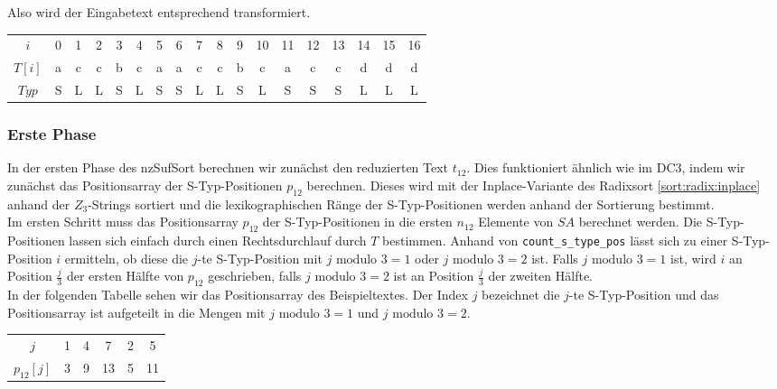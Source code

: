 Also wird der Eingabetext entsprechend transformiert.

\begin{table}[H]
	\footnotesize
	\centering
	\begin{tabular}{c| c c c c c c c c c c c c c c c c c}
		$i$ & 0 & 1 & 2 & 3 & 4 & 5 & 6 & 7 & 8 & 9 & 10 & 11 & 12 & 13 & 14 & 15 & 16 \\
		$T[i]$ & a & c & c & b & c & a & a & c & c & b & c & a & c & c & d & d & d \\
		$Typ$ & S & L & L & S & L & S & S & L & L & S & L & S & S & S & L & L & L
	\end{tabular}
\end{table}

\subsubsection{Erste Phase}

In der ersten Phase des nzSufSort berechnen wir zunächst den reduzierten Text $t_{12}$. Dies funktioniert ähnlich wie im DC3, indem wir zunächst das Positionsarray der S-Typ-Positionen $p_{12}$ berechnen. Dieses wird mit der Inplace-Variante des Radixsort \cref{sort:radix:inplace} anhand der $Z_3$-Strings sortiert und die lexikographischen Ränge der S-Typ-Positionen werden anhand der Sortierung bestimmt. \\

Im ersten Schritt muss das Positionsarray $p_{12}$ der S-Typ-Positionen in die ersten $n_{12}$ Elemente von $SA$ berechnet werden. Die S-Typ-Positionen lassen sich einfach durch einen Rechtsdurchlauf durch $T$ bestimmen. Anhand von  \texttt{count\_s\_type\_pos} lässt sich zu einer S-Typ-Position $i$ ermitteln, ob diese die $j$-te S-Typ-Position mit $j \text{ modulo } 3 = 1$ oder $j \text{ modulo } 3 = 2$ ist. Falls $j \text{ modulo } 3 = 1$ ist, wird $i$ an Position $\frac{j}{3}$ der ersten Hälfte von $p_{12}$ geschrieben, falls $j \text{ modulo } 3 = 2$ ist an Position $\frac{j}{3}$ der zweiten Hälfte. \\
In der folgenden Tabelle sehen wir das Positionsarray des Beispieltextes. Der Index $j$ bezeichnet die $j$-te S-Typ-Position und das Positionsarray ist aufgeteilt in die Mengen mit $j \text{ modulo } 3 = 1$ und $j \text{ modulo } 3 = 2$.

\begin{table}[H]
	\footnotesize
	\centering
	\begin{tabular}{c| c c c || c c }
		$j$ & 1 & 4 & 7 & 2 & 5 \\
		$p_{12}[j]$ & 3 & 9 & 13 & 5 & 11 
	\end{tabular}
\end{table}


